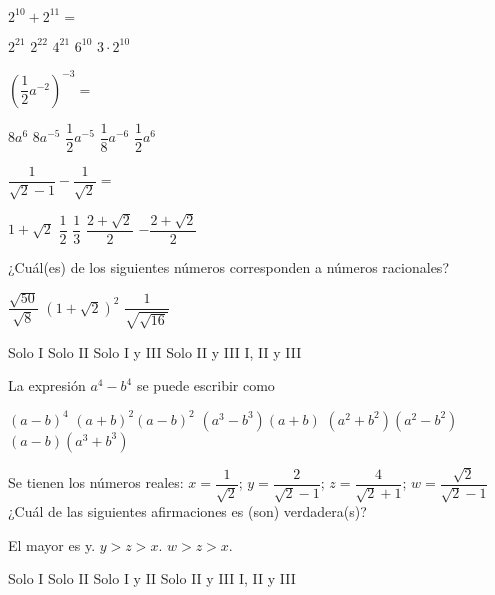 \documentclass[sin fecha]{srs}
\begin{document}
\begin{preguntas}[after-item-skip=1cm]
\pregunta $2^{10} + 2^{11} =$
\begin{vertical}
\alternativa $2^{21}$
\alternativa $2^{22}$
\alternativa $4^{21}$
\alternativa $6^{10}$
\alternativa $3 \cdot 2^{10}$
\end{vertical}

\pregunta $\left(\dfrac{1}{2}a^{-2}\right)^{-3} =$
\begin{vertical}
\alternativa $8a^6$
\alternativa $8a^{-5}$
\alternativa $\dfrac{1}{2}a^{-5}$
\alternativa $\dfrac{1}{8}a^{-6}$
\alternativa $\dfrac{1}{2}a^6$
\end{vertical}

\pregunta $\dfrac{1}{\sqrt{2} - 1} - \dfrac{1}{\sqrt{2}} =$
\begin{vertical}
\alternativa $1 + \sqrt{2}$
\alternativa $\dfrac{1}{2}$
\alternativa $\dfrac{1}{3}$
\alternativa $\dfrac{2 + \sqrt{2}}{2}$
\alternativa $-\dfrac{2 + \sqrt{2}}{2}$
\end{vertical}

\pregunta ¿Cuál(es) de los siguientes números corresponden a números racionales?
\begin{verticali}
\alternativa $\dfrac{\sqrt{50}}{\sqrt{8}}$
\alternativa $\left(1 + \sqrt{2}\right)^2$
\alternativa $\dfrac{1}{\sqrt{\sqrt{16}}}$
\end{verticali}
\begin{vertical}
\alternativa Solo I
\alternativa Solo II
\alternativa Solo I y III
\alternativa Solo II y III
\alternativa I, II y III
\end{vertical}

\pregunta La expresión $a^4 - b^4$ se puede escribir como
\begin{vertical}
\alternativa $\left(a-b\right)^4$
\alternativa $\left(a+b\right)^2\left(a-b\right)^2$
\alternativa $\left(a^3-b^3\right)\left(a+b\right)$
\alternativa $\left(a^2+b^2\right)\left(a^2-b^2\right)$
\alternativa $\left(a-b\right)\left(a^3+b^3\right)$
\end{vertical}

\pregunta Se tienen los números reales: $x = \dfrac{1}{\sqrt{2}}$; $y = \dfrac{2}{\sqrt{2} - 1}$; $z = \dfrac{4}{\sqrt{2} + 1}$; $w = \dfrac{\sqrt{2}}{\sqrt{2} - 1}$ ¿Cuál de las siguientes afirmaciones es (son) verdadera(s)?
\begin{verticali}
\alternativa El mayor es y.
\alternativa $y > z > x$.
\alternativa $w > z > x$.
\end{verticali}
\begin{vertical}
\alternativa Solo I
\alternativa Solo II
\alternativa Solo I y II
\alternativa Solo II y III
\alternativa I, II y III
\end{vertical}



\end{preguntas}
\end{document}
